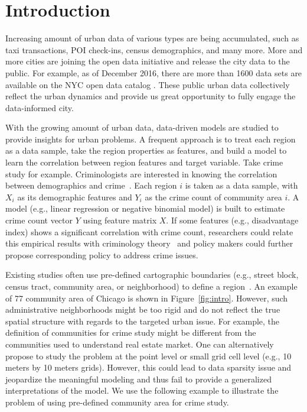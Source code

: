 \section{Introduction}

Increasing amount of urban data of various types are being accumulated, such as taxi transactions, POI check-ins, census demographics, and many more. More and more cities are joining the open data initiative and release the city data to the public. For example, as of December 2016, there are more than 1600 data sets are available on the NYC open data catalog \cite{nyc-open-data}. These public urban data collectively reflect the urban dynamics and provide us great opportunity to fully engage the data-informed city. 


With the growing amount of urban data, data-driven models are studied to provide insights for urban problems. A frequent approach is to treat each region as a data sample, take the region properties as features, and build a model to learn the correlation between region features and target variable. Take crime study for example. Criminologists are interested in knowing the correlation between  demographics and crime~\cite{wang2016crime,wang2017non}. Each region $i$ is taken as a data sample, with $X_i$ as its demographic features and $Y_i$ as the crime count of community area $i$. A model (e.g., linear regression or negative binomial model) is built to estimate crime count vector $Y$ using feature matrix $X$. If some features (e.g., disadvantage index) shows a significant correlation with crime count, researchers could relate this empirical results with criminology theory~\cite{graif2017long} and policy makers could further propose corresponding policy to address crime issues.

Existing studies often use pre-defined cartographic boundaries (e.g., street block, census tract, community area, or neighborhood) to define a region~\cite{yuan2012discovering,wang2016crime}. An example of 77 community area of Chicago is shown in Figure~\ref{fig:intro}. However, such administrative neighborhoods might be too rigid and do not reflect the true spatial structure with regards to the targeted urban issue. For example, the definition of communities for crime study might be different from the communities used to understand real estate market. One can alternatively propose to study the problem at the point level or small grid cell level (e.g., 10 meters by 10 meters grids). However, this could lead to data sparsity issue and jeopardize the meaningful modeling and thus fail to provide a generalized interpretations of the model. We use the following example to illustrate the problem of using pre-defined community area for crime study.

